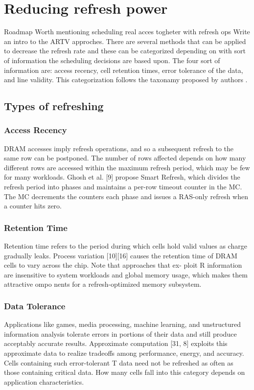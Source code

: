 \section{Reducing refresh power} 
\label{sec:red}
Roadmap 
Worth mentioning scheduling real acces togheter with refresh ops
Write an intro to the ARTV approches.
There are several methods that can be applied to decrease the refresh rate and these can be categorized depending on with sort of information the scheduling decisions are based upon. The four sort of information are: access recency, cell retention times, error tolerance of the data, and line validity. This categorization follows the taxonamy proposed by authors \cite{dtail}. 

\subsection{Types of refreshing}

\subsubsection*{\textbf{Access Recency}}
DRAM accesses imply refresh operations, and so a subsequent refresh to the same row can be postponed. The number of rows affected depends on how many different rows are accessed within the maximum refresh period, which may be few for many workloads. Ghosh et al. [9] propose Smart Refresh, which divides the refresh period into phases and maintains a per-row timeout counter in the MC. The MC decrements the counters each phase and issues a RAS-only refresh when a counter hits zero.


\subsubsection*{\textbf{Retention Time}}
Retention time refers to the period during which cells hold valid values as charge gradually leaks. Process variation [10][16] causes the retention time of DRAM cells to vary across the chip. Note that approaches that ex-
ploit R information are insensitive to system workloads and global memory usage, which makes them attractive ompo
nents for a refresh-optimized memory subsystem.

\subsubsection*{\textbf{Data Tolerance}}
Applications like games, media processing, machine learning, and unstructured information analysis tolerate errors in portions of their data and still produce acceptably accurate results. Approximate computation [31, 8] exploits this approximate data to realize tradeoffs among performance, energy, and accuracy. Cells containing such error-tolerant T data need not be refreshed as often as those containing critical data. How many cells fall into this category depends on application characteristics.


